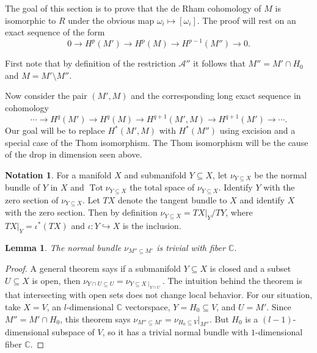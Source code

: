 \documentclass[article,twoside]{article}
\newcommand{\CC}{\mathbb{C}}
\newcommand{\script}[1]{\mathcal{#1}}
\newcommand{\tot}{\operatorname{Tot}}
\theoremstyle{plain}
\theoremstyle{plain}
\newtheorem{lemma}[lemma]{Lemma}
\theoremstyle{plain}
\theoremstyle{plain}
\theoremstyle{plain}
\theoremstyle{definition}
\theoremstyle{definition}
\newtheorem{notation}[notation]{Notation}
\theoremstyle{definition}
\theoremstyle{remark}
\theoremstyle{remark}
\begin{document}
The goal of this section is to prove that the de Rham cohomology of $M$ is isomorphic to $R$ under the obvious map $\omega_i\mapsto [\omega_i]$. The proof will rest on an exact sequence of the form
$$
0\to H^p(M') \to H^p(M) \to H^{p-1}(M'') \to 0.
$$

First note that by definition of the restriction $\script{A}''$ it follows that $M'' = M'\cap H_0$ and $M=M'\setminus M''$.

Now consider the pair $(M',M)$ and the corresponding long exact sequence in cohomology
$$
\cdots \to H^q(M') \to H^q(M) \to H^{q+1}(M',M) \to H^{q+1}(M') \to \cdots.
$$
Our goal will be to replace $H^*(M',M)$ with $H^*(M'')$ using excision and a special case of the Thom isomorphism. The Thom isomorphism will be the cause of the drop in dimension seen above.





%
%
%
%
%

\begin{notation}
	For a manifold $X$ and submanifold $Y\subseteq X$, let $\nu_{Y\subseteq X}$ be the normal bundle of $Y$ in $X$ and $\tot\nu_{Y\subseteq X}$ the total space of $\nu_{Y\subseteq X}$. Identify $Y$ with the zero section of $\nu_{Y\subseteq X}$. Let $TX$ denote the tangent bundle to $X$ and identify ${X}$ with the zero section. Then by definition $\nu_{Y\subseteq X} = TX|_{Y}/TY$, where $TX|_{Y} = \iota^*(TX)$ and $\iota:Y\hookrightarrow X$ is the inclusion.
\end{notation}


\begin{lemma}\label{M''_trivial_normal_bundle}
	The normal bundle $\nu_{M''\subseteq M'}$ is trivial with fiber $\CC$.
\end{lemma}
\begin{proof}
	A general theorem says if a submanifold $Y\subseteq X$ is closed and  a subset $U\subseteq X$ is open, then $\nu_{Y\cap U\subseteq U} = \nu_{Y\subseteq X \mid _{Y\cap U}}$. The intuition behind the theorem is that intersecting with open sets does not change local behavior. For our situation, take $X=V$, an $l$-dimensional $\CC$ vectorspace, $Y = H_0\subseteq V$, and $U = M'$. Since $M'' = M'\cap H_0$, this theorem says $\nu_{M''\subseteq M'} = \nu_{H_0\subseteq V}|_{M''}$. But $H_0$ is a $(l-1)$-dimensional subspace of $V$, so it has a trivial normal bundle with $1$-dimensional fiber $\CC$.
\end{proof}
\end{document}
